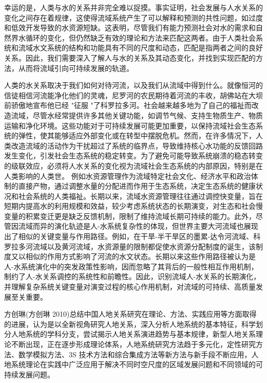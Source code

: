 

幸运的是，人类与水的关系并非完全难以捉摸。事实证明，社会发展与人水关系的变化之间存在着规律，这使得流域系统产生了可以解释和预测的共性问题，如过度和低效开发导致的水资源短缺。这表明，尽管我们有能力预测社会对水的需求和自然界水循环的变化，但仍然缺乏有效的理论和方法来匹配这两者。由于人类社会系统和流域水文系统的结构和功能具有不同的尺度和动态，匹配是指两者之间的良好关系。因此，我们需要深入了解人与水的关系及其动态变化，并找到实现匹配的方法，从而将流域引向可持续发展的轨道。

人类的水关系取决于我们如何对待河流，以及我们从流域中得到什么。就像恒河的信徒相信河流能净化他们的灵魂，尼罗河的农民期待着河流的丰收，胡佛站在大坝前骄傲地宣布他已经 "征服 "了科罗拉多河。社会越来越多地为了自己的福祉而改造流域，尽管水经常提供许多其他关键功能，如调节气候、支持生物质生产、物质运输和净化环境。这些功能对于可持续发展可能更加重要，以保持流域社会生态系统的弹性，使其能够适应外部变化或在转型中摆脱危机。然而，在许多情况下，人类改造流域的活动作为干扰超过了系统的临界点，导致维持核心水功能的反馈回路发生变化，引发社会生态系统的稳定转变。为了避免可能导致系统崩溃的稳态转变的级联效应，必须将人水关系的变化视为流域社会生态系统的内部原因，特别是在人类影响的人类世。
例如水资源管理作为流域特定社会文化、经济水平和政治体制的直接产物，通过调整水量的分配进而作用于生态系统，决定生态系统的健康状况和社会系统的人类福祉。长期以来，流域水资源管理往往通过调控快变量，旨在短期内提高水的利用规模和效益，较少考虑系统状态的长期演变，对生态和社会慢变量的积累变迁更是缺乏反馈机制，限制了维持流域长期可持续的能力。此外，尽管因流域而异的演化轨迹是人-水系统复杂性的体现，但世界主要大河流域也展现出了相似的关键变量与作用路径。例如，在干旱-半干旱区的墨累-达令河流域、科罗拉多河流域以及黄河流域，水资源量的限制都促使水资源分配制度的诞生，该制度又以相似的作用方式影响了河流的水文状态。长期以来这些作用路径被认为是人-水系统演化中的突发政策性影响，因而忽略了其背后的一般性相互作用机制，制约了人-水关系调控的系统性和前瞻性。因此，识别流域人-水关系的长期演化，并理解复杂系统关键变量对演变过程的核心作用机制，对流域的可持续、高质量发展至关重要。

方创琳(方创琳 2010)总结中国人地关系研究在理论、方法、实践应用等方面取得的进展，认为是以全新视角研究人地关系，深入分析人地系统的基本特征，科学划分人地系统的学科分支，尝试揭示人地关系演进趋势与基本规律，新型人地关系理论不断出现，正在逐步形成理论体系，人地系统研究方法趋于多元化，定性研究方法、数学模拟方法、3S 技术方法和综合集成方法等新方法与新手段不断应用，人地系统理论在实践中广泛应用于解决不同时空尺度的区域发展问题和不同领域的可持续发展问题。

